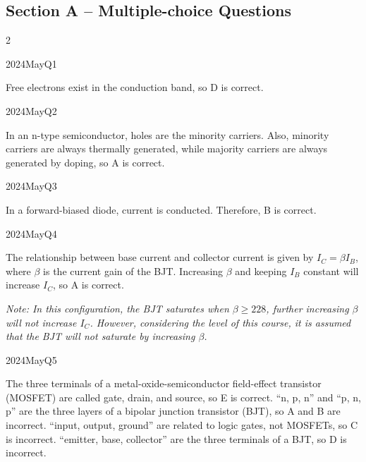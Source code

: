 
\subsection*{Section A -- Multiple-choice Questions}
\begin{multicols}{2}

\begin{qsolution}{2024}{May}{Q1}{\tgElectronics \tgElectronicsSemiconductor}

    Free electrons exist in the conduction band, so D is correct.
\end{qsolution}

\begin{qsolution}{2024}{May}{Q2}{\tgElectronics \tgElectronicsSemiconductor}

    In an n-type semiconductor, holes are the minority carriers.
    Also, minority carriers are always thermally generated, while majority carriers are always generated by doping, so A is correct.
\end{qsolution}

\begin{qsolution}{2024}{May}{Q3}{\tgElectronics \tgElectronicsDiodes}

    In a forward-biased diode, current is conducted.
    Therefore, B is correct.
\end{qsolution}

\begin{qsolution}{2024}{May}{Q4}{\tgElectronics \tgElectronicsBJT \tgOutSyl}

    The relationship between base current and collector current is given by $I_C = \beta I_B$, where $\beta$ is the current gain of the BJT.
    Increasing $\beta$ and keeping $I_B$ constant will increase $I_C$, so A is correct.

    {\itshape
        Note:
        In this configuration, the BJT saturates when $\mathit{\beta\geq 228}$, further increasing $\mathit{\beta}$ will not increase $\mathit{I_C}$.
        However, considering the level of this course, it is assumed that the BJT will not saturate by increasing $\mathit{\beta}$.
    }
\end{qsolution}

\begin{qsolution}{2024}{May}{Q5}{\tgElectronics \tgElectronicsMOSFET}

    The three terminals of a metal-oxide-semiconductor field-effect transistor (MOSFET) are called gate, drain, and source, so E is correct.
    ``n, p, n'' and ``p, n, p'' are the three layers of a bipolar junction transistor (BJT), so A and B are incorrect.
    ``input, output, ground'' are related to logic gates, not MOSFETs, so C is incorrect.
    ``emitter, base, collector'' are the three terminals of a BJT, so D is incorrect.
\end{qsolution}


\end{multicols}
